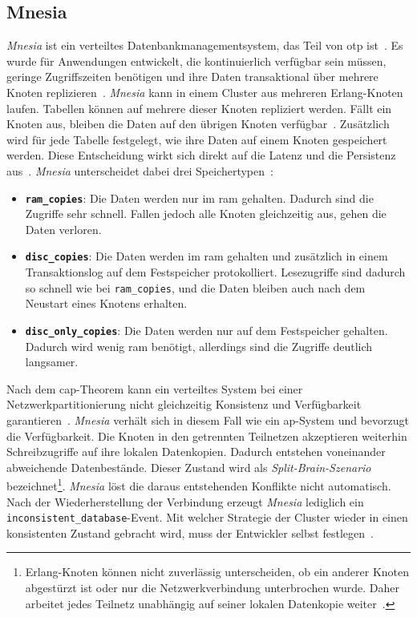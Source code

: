 \subsection{Mnesia}
\label{sub:grundlagen-mnesia}

\textit{Mnesia} ist ein verteiltes Datenbankmanagementsystem, das Teil von \gls{otp} ist~\citep{mattsson1999mnesia, mnesia}. Es wurde für Anwendungen entwickelt, die kontinuierlich verfügbar sein müssen, geringe Zugriffszeiten benötigen und ihre Daten transaktional über mehrere Knoten replizieren~\citep{mattsson1999mnesia}. \textit{Mnesia} kann in einem Cluster aus mehreren Erlang-Knoten laufen. Tabellen können auf mehrere dieser Knoten repliziert werden. Fällt ein Knoten aus, bleiben die Daten auf den übrigen Knoten verfügbar~\citep{mattsson1999mnesia}. Zusätzlich wird für jede Tabelle festgelegt, wie ihre Daten auf einem Knoten gespeichert werden. Diese Entscheidung wirkt sich direkt auf die Latenz und die Persistenz aus~\citep{mnesia}. \textit{Mnesia} unterscheidet dabei drei Speichertypen~\citep{mnesia}:

\begin{itemize}
    \item \textbf{\texttt{ram\_copies}}: Die Daten werden nur im \gls{ram} gehalten. Dadurch sind die Zugriffe sehr schnell. Fallen jedoch alle Knoten gleichzeitig aus, gehen die Daten verloren.

    \item \textbf{\texttt{disc\_copies}}: Die Daten werden im \gls{ram} gehalten und zusätzlich in einem Transaktionslog auf dem Festspeicher protokolliert. Lesezugriffe sind dadurch so schnell wie bei \texttt{ram\_copies}, und die Daten bleiben auch nach dem Neustart eines Knotens erhalten.

    \item \textbf{\texttt{disc\_only\_copies}}: Die Daten werden nur auf dem Festspeicher gehalten. Dadurch wird wenig \gls{ram} benötigt, allerdings sind die Zugriffe deutlich langsamer.
\end{itemize}

\newpage

Nach dem \gls{cap}-Theorem kann ein verteiltes System bei einer Netzwerkpartitionierung nicht gleichzeitig Konsistenz und Verfügbarkeit garantieren~\citep{gilbert2002}. \textit{Mnesia} verhält sich in diesem Fall wie ein \gls{ap}-System und bevorzugt die Verfügbarkeit. Die Knoten in den getrennten Teilnetzen akzeptieren weiterhin Schreibzugriffe auf ihre lokalen Datenkopien. Dadurch entstehen voneinander abweichende Datenbestände. Dieser Zustand wird als \textit{Split-Brain-Szenario} bezeichnet\footnote{Erlang-Knoten können nicht zuverlässig unterscheiden, ob ein anderer Knoten abgestürzt ist oder nur die Netzwerkverbindung unterbrochen wurde. Daher arbeitet jedes Teilnetz unabhängig auf seiner lokalen Datenkopie weiter~\citep{cesarini2015designing}.}. \textit{Mnesia} löst die daraus entstehenden Konflikte nicht automatisch. Nach der Wiederherstellung der Verbindung erzeugt \textit{Mnesia} lediglich ein \texttt{inconsistent\_database}-Event. Mit welcher Strategie der Cluster wieder in einen konsistenten Zustand gebracht wird, muss der Entwickler selbst festlegen~\citep{mnesia}.